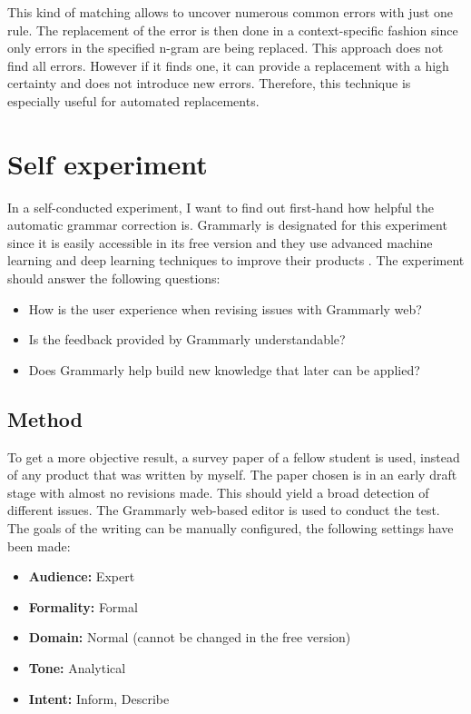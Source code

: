 \documentclass[runningheads]{llncs}
\let\OldTextregistered\textregistered
\renewcommand{\textregistered}{\OldTextregistered\xspace}
\begin{document}
This kind of matching allows to uncover numerous common errors with just one rule. The replacement of the error is then done in a context-specific fashion since only errors in the specified n-gram are being replaced. This approach does not find all errors. However if it finds one, it can provide a replacement with a high certainty and does not introduce new errors. Therefore, this technique is especially useful for automated replacements.


\section{Self experiment}
In a self-conducted experiment, I want to find out first-hand how helpful the automatic grammar correction is. Grammarly\textregistered is designated for this experiment since it is easily accessible in its free version and they use advanced machine learning and deep learning techniques to improve their products \citep{noauthor_grammarly_nodate}. The experiment should answer the following questions:

\begin{itemize}
 \item How is the user experience when revising issues with Grammarly\textregistered web?
 \item Is the feedback provided by Grammarly\textregistered understandable?
 \item Does Grammarly\textregistered help build new knowledge that later can be applied?
\end{itemize}


\subsection{Method}
To get a more objective result, a survey paper of a fellow student is used, instead of any product that was written by myself. The paper chosen is in an early draft stage with almost no revisions made. This should yield a broad detection of different issues. The Grammarly\textregistered web-based editor is used to conduct the test. The goals of the writing can be manually configured, the following settings have been made:

\begin{itemize}
 \item \textbf{Audience:} Expert
 \item \textbf{Formality:} Formal
 \item \textbf{Domain:} Normal (cannot be changed in the free version)
 \item \textbf{Tone:} Analytical
 \item \textbf{Intent:} Inform, Describe
\end{itemize}
\end{document}
